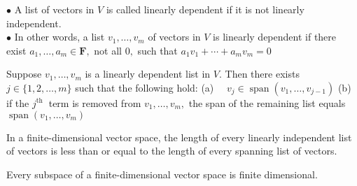 $\bullet$ A list of vectors in $V$ is called linearly dependent if it is not linearly independent. \\
$\bullet$ In other words, a list $v_{1}, \ldots, v_{m}$ of vectors in $V$ is linearly dependent if there exist $a_{1}, \ldots, a_{m} \in \mathbf{F},$ not all $0,$ such that $a_{1} v_{1}+\cdots+a_{m} v_{m}=0$

Suppose $v_{1}, \ldots, v_{m}$ is a linearly dependent list in $V .$ Then there exists $j \in\{1,2, \ldots, m\}$ such that the following hold:
(a) $\quad v_{j} \in \operatorname{span}\left(v_{1}, \ldots, v_{j-1}\right)$
(b) if the $j^{\text {th }}$ term is removed from $v_{1}, \ldots, v_{m},$ the span of the remaining list equals $\operatorname{span}\left(v_{1}, \ldots, v_{m}\right)$

In a finite-dimensional vector space, the length of every linearly independent list of vectors is less than or equal to the length of every spanning list of vectors.

Every subspace of a finite-dimensional vector space is finite dimensional. 
